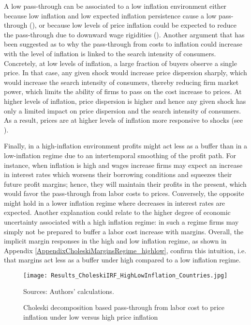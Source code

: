 \documentclass[11pt]{article}
\begin{document}
A low pass-through can be associated to a low inflation environment either because low inflation and low expected inflation persistence cause a low pass-through (\cite{Taylor00}), or because low levels of price inflation could be expected to reduce the pass-through due to downward wage rigidities (\cite{Daly_Hobijn_2014}). 
Another argument that has been suggested as to why the pass-through from costs to inflation could increase with the level of inflation is linked to the search intensity of consumers. Concretely, at low levels of inflation, a large fraction of buyers observe a single price. In that case, any given shock would increase price dispersion sharply, which would increase the search intensity of consumers, thereby reducing firm market power, which limits the ability of firms to pass on the cost increase to prices. At higher levels of inflation, price dispersion is higher and hence any given shock has only a limited impact on price dispersion and the search intensity of consumers. As a result, prices are at higher levels of inflation more responsive to shocks (see \cite{Head_10}). 

Finally, in a high-inflation environment profits might act less as a buffer than in a low-inflation regime due to an intertemporal smoothing of the profit path. For instance, when inflation is high and wages increase firms may expect an increase in interest rates which worsens their borrowing conditions and squeezes their future profit margins; hence, they will maintain their profits in the present, which would favor the pass-through from labor costs to prices. Conversely, the opposite might hold in a lower inflation regime where decreases in interest rates are expected. Another explanation could relate to the higher degree of economic uncertainty associated with a high inflation regime: in such a regime firms may simply not be prepared to buffer a labor cost increase with margins. Overall, the implicit margin responses in the high and low inflation regime, as shown in  Appendix \ref{AppendixCholeskiMarginsRegime_highlow}, confirm this intuition, i.e. that margins act less as a buffer under high compared to a low inflation regime.

\begin{figure}[!htbp]
\begin{center}
\caption{Choleski decomposition based pass-through from labor cost to price inflation under low versus high price inflation}\label{fig:Figure_CholeskiIRF_HighLowInflation}
\texttt{[image: Results\_CholeskiIRF\_HighLowInflation\_Countries.jpg]}
\begin{minipage}{\textwidth} {\footnotesize
Sources: Authors' calculations.\par}
\end{minipage}
\end{center}
\end{figure}
\end{document}
